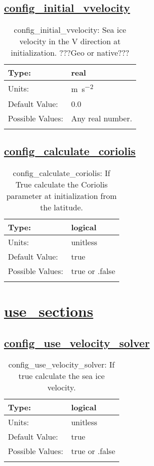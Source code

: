 \subsection[config\_initial\_vvelocity]{\hyperref[sec:nm_tab_initialize]{config\_initial\_vvelocity}}
\label{subsec:nm_sec_config_initial_vvelocity}
\begin{center}
\begin{longtable}{| p{2.0in} || p{4.0in} |}
    \hline
    Type: & real \\
    \hline
    Units: & \si{m.s^{-2}} \\
    \hline
    Default Value: & 0.0 \\
    \hline
    Possible Values: & Any real number. \\
    \hline
    \caption{config\_initial\_vvelocity: Sea ice velocity in the V direction at initialization. ???Geo or native???}
\end{longtable}
\end{center}
\subsection[config\_calculate\_coriolis]{\hyperref[sec:nm_tab_initialize]{config\_calculate\_coriolis}}
\label{subsec:nm_sec_config_calculate_coriolis}
\begin{center}
\begin{longtable}{| p{2.0in} || p{4.0in} |}
    \hline
    Type: & logical \\
    \hline
    Units: & \si{unitless} \\
    \hline
    Default Value: & true \\
    \hline
    Possible Values: & true or .false \\
    \hline
    \caption{config\_calculate\_coriolis: If True calculate the Coriolis parameter at initialization from the latitude.}
\end{longtable}
\end{center}
\section[use\_sections]{\hyperref[sec:nm_tab_use_sections]{use\_sections}}
\label{sec:nm_sec_use_sections}
\subsection[config\_use\_velocity\_solver]{\hyperref[sec:nm_tab_use_sections]{config\_use\_velocity\_solver}}
\label{subsec:nm_sec_config_use_velocity_solver}
\begin{center}
\begin{longtable}{| p{2.0in} || p{4.0in} |}
    \hline
    Type: & logical \\
    \hline
    Units: & \si{unitless} \\
    \hline
    Default Value: & true \\
    \hline
    Possible Values: & true or .false \\
    \hline
    \caption{config\_use\_velocity\_solver: If true calculate the sea ice velocity.}
\end{longtable}
\end{center}

